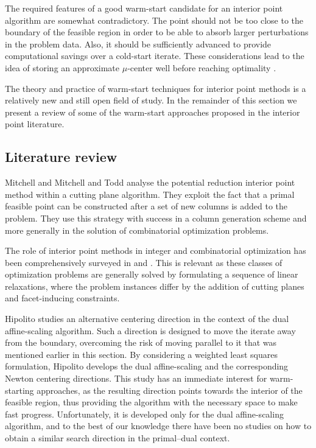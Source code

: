 The required features of a good warm-start candidate for an
interior point algorithm are somewhat contradictory.
The point should not be too close to the boundary of the feasible 
region in order to be able to absorb larger perturbations in the 
problem data. 
Also, it should be sufficiently advanced to provide 
computational savings over a cold-start iterate.
These considerations lead to the idea of storing an approximate
$\mu$-center well before reaching optimality 
\cite{Gondzio98,GondzioGrothey03,GondzioVial,YildirimWright}.

The theory and practice of warm-start techniques for interior point 
methods is a relatively new and still open field of study.
In the remainder of this section we present a review of some 
of the warm-start approaches proposed in the interior point literature.

%
%
\subsection{Literature review}

Mitchell \cite{phd:Mitchell} and Mitchell and Todd \cite{MitchellTodd}
analyse the potential reduction interior point method within
a cutting plane algorithm. They exploit the fact that
a primal feasible point can be constructed after a set of new
columns is added to the problem. They use this strategy with success
in a column generation scheme and more generally in the solution 
of combinatorial optimization problems.

The role of interior point methods in integer and combinatorial 
optimization has been comprehensively surveyed in \cite{Mitchell96} 
and \cite{MitchellPardalosResende98}. This is relevant as these classes
of optimization problems are generally solved by formulating a sequence
of linear relaxations, where the problem instances differ by the
addition of cutting planes and facet-inducing constraints.

Hipolito \cite{Hipolito} studies an alternative centering direction 
in the context of the dual affine-scaling algorithm. Such a 
direction is designed to move the iterate away from the boundary, 
overcoming the risk of moving parallel to it that was mentioned 
earlier in this section.
By considering a weighted least squares formulation, Hipolito 
develops the dual affine-scaling and the corresponding Newton 
centering directions. 
This study has an immediate interest for warm-starting approaches,
as the resulting direction points towards the interior of the 
feasible region, thus providing the algorithm with the necessary 
space to make fast progress. 
Unfortunately, it is developed only for the dual affine-scaling 
algorithm, and to the best of our knowledge there have been no 
studies on how to obtain a similar search direction in the 
primal--dual context.

